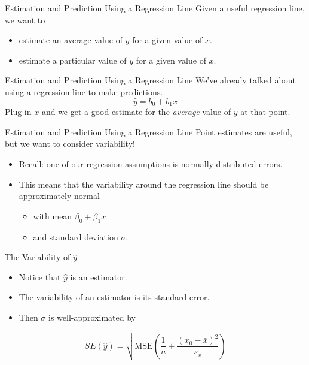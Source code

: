 \begin{frame}{Estimation and Prediction Using a Regression Line}
    Given a useful regression line, we want to 
    \begin{itemize}
        \item estimate an average value of $y$ for a given value of $x$.
        \item estimate a particular value of $y$ for a given value of $x$.
    \end{itemize}
\end{frame}

\begin{frame}{Estimation and Prediction Using a Regression Line}
    We've already talked about using a regression line to make predictions.
    \[
        \hat{y}=b_0 + b_1x
    \]
    Plug in $x$ and we get a good estimate for the \textit{average} value of $y$ at that point.
\end{frame}

\begin{frame}{Estimation and Prediction Using a Regression Line}
    Point estimates are useful, but we want to consider variability!
    \begin{itemize}
        \item Recall: one of our regression assumptions is normally distributed errors.
        \item This means that the variability around the regression line should be approximately normal 
        \begin{itemize}
            \item with mean $\beta_0 + \beta_1 x$
            \item and standard deviation $\sigma$.
        \end{itemize}
    \end{itemize}
\end{frame}

\begin{frame}{The Variability of $\hat{y}$}
    \begin{itemize}
        \item Notice that $\hat{y}$ is an estimator.
        \item The variability of an estimator is its standard error.
        \item Then $\sigma$ is well-approximated by 
    \end{itemize}
    \[
        SE(\hat{y}) = \sqrt{\text{MSE}\left(\frac{1}{n} + \frac{(x_0-\bar{x})^2}{s_x}\right)}
    \]
\end{frame}

